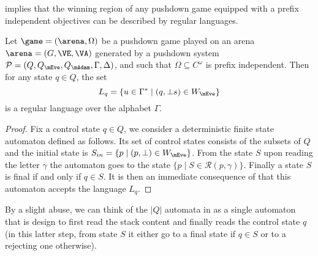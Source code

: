  implies that the winning region of any pushdown game equipped with a prefix independent objectives can be described by regular languages.

\begin{theorem}\label{10-thm:regularity-wr}
Let $\game=(\arena,\Omega)$ be a pushdown game played on an arena $\arena = (G,\VE,\VA)$ generated by a pushdown system $\PDS = (Q,Q_{\mEve}, Q_{\mAdam}, \Gamma,\Delta)$, and such that $\Omega\subseteq C^\omega$ is prefix independent. Then for any state $q\in Q$, the set \[
L_q=\{u\in \Gamma^*\mid (q,\bot s)\in W_\mEve \}
\] is a regular language over the alphabet $\Gamma$.
\end{theorem}

\begin{proof}
Fix a control state $q \in Q$, we consider a deterministic finite state automaton defined as follows. Its set of control states consists of the subsets of $Q$ and the initial state is $S_{in}=\{p\mid (p,\bot)\in W_\mEve\}$. From the state $S$ upon reading the letter $\gamma$ the automaton goes to the state $\{p\mid S\in\mathcal{R}(p,\gamma)\}$. Finally a state $S$ is final if and only if $q\in S$. It is then an immediate consequence of  that this automaton accepts the language $L_q$.
\end{proof}


\begin{remark}\label{10-rk:automata-winning-region}
By a slight abuse, we can think of the $|Q|$ automata in 	as a single automaton that is design to first read the stack content and finally reads the control state $q$ (in this latter step, from state $S$ it either go to a final state if $q\in S$ or to a rejecting one otherwise).
\end{remark}


